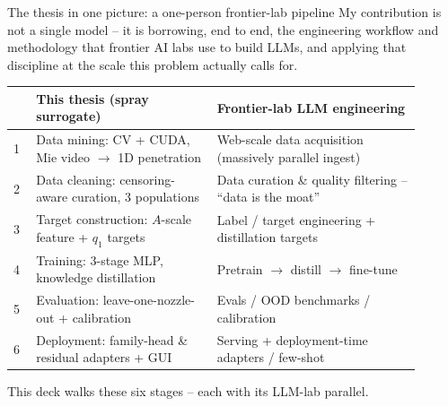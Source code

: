 \documentclass[aspectratio=169,11pt]{beamer}
\newcommand{\blue}[1]{\textcolor{aaltoBlue}{#1}}
\begin{document}
\begin{frame}{The thesis in one picture: a one-person frontier-lab pipeline}
\footnotesize
My contribution is not a single model -- it is borrowing, end to end, the
\blue{engineering workflow and methodology} that frontier AI labs use to build LLMs,
and applying that discipline at the scale this problem actually calls for.
\medskip

\begin{center}
\renewcommand{\arraystretch}{1.04}
\begin{tabular}{L{0.05\linewidth} L{0.40\linewidth} L{0.45\linewidth}}
\toprule
 & \textbf{This thesis (spray surrogate)} & \textbf{\blue{Frontier-lab LLM engineering}} \\
 & Data mining: CV + CUDA, Mie video $\to$ 1D penetration & Web-scale data acquisition (massively parallel ingest) \\
2 & Data cleaning: censoring-aware curation, 3 populations & Data curation \& quality filtering -- ``data is the moat'' \\
3 & Target construction: $A$-scale feature + $q_1$ targets & Label / target engineering + distillation targets \\
4 & Training: 3-stage MLP, knowledge distillation & Pretrain $\to$ distill $\to$ fine-tune \\
5 & Evaluation: leave-one-nozzle-out + calibration & Evals / OOD benchmarks / calibration \\
6 & Deployment: family-head \& residual adapters + GUI & Serving + deployment-time adapters / few-shot \\
\bottomrule
\end{tabular}
\end{center}
\smallskip
\begin{center}\small\blue{This deck walks these six stages -- each with its LLM-lab parallel.}\end{center}
\end{frame}




\end{document}
